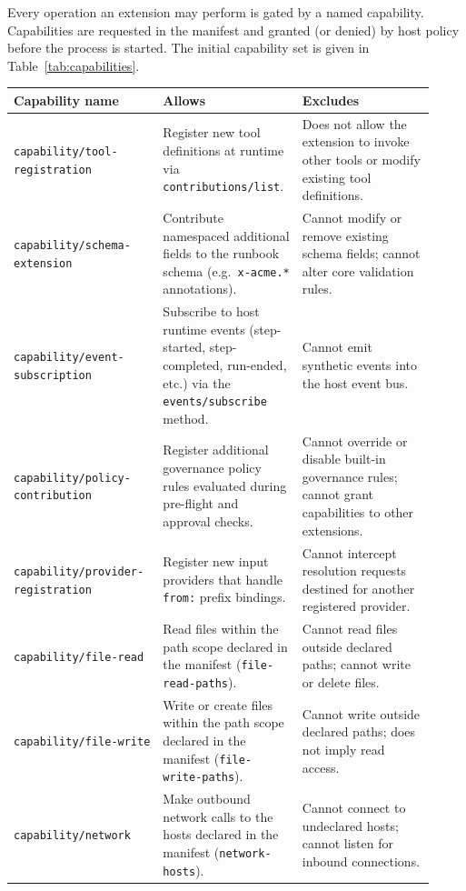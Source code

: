 Every operation an extension may perform is gated by a named capability.
Capabilities are requested in the manifest and granted (or denied) by host
policy before the process is started.  The initial capability set is given in
Table~\ref{tab:capabilities}.

\begin{table}[ht]
\centering
\begin{tabular}{p{0.32\linewidth}p{0.30\linewidth}p{0.30\linewidth}}
\hline
\textbf{Capability name} & \textbf{Allows} & \textbf{Excludes} \\
\hline
\texttt{capability/tool-registration} &
  Register new tool definitions at runtime via \texttt{contributions/list}. &
  Does not allow the extension to invoke other tools or modify existing tool
  definitions. \\
\hline
\texttt{capability/schema-extension} &
  Contribute namespaced additional fields to the runbook schema (e.g.\
  \texttt{x-acme.*} annotations). &
  Cannot modify or remove existing schema fields; cannot alter core validation
  rules. \\
\hline
\texttt{capability/event-subscription} &
  Subscribe to host runtime events (step-started, step-completed, run-ended,
  etc.) via the \texttt{events/subscribe} method. &
  Cannot emit synthetic events into the host event bus. \\
\hline
\texttt{capability/policy-contribution} &
  Register additional governance policy rules evaluated during pre-flight and
  approval checks. &
  Cannot override or disable built-in governance rules; cannot grant
  capabilities to other extensions. \\
\hline
\texttt{capability/provider-registration} &
  Register new input providers that handle \texttt{from:} prefix bindings. &
  Cannot intercept resolution requests destined for another registered
  provider. \\
\hline
\texttt{capability/file-read} &
  Read files within the path scope declared in the manifest
  (\texttt{file-read-paths}). &
  Cannot read files outside declared paths; cannot write or delete files. \\
\hline
\texttt{capability/file-write} &
  Write or create files within the path scope declared in the manifest
  (\texttt{file-write-paths}). &
  Cannot write outside declared paths; does not imply read access. \\
\hline
\texttt{capability/network} &
  Make outbound network calls to the hosts declared in the manifest
  (\texttt{network-hosts}). &
  Cannot connect to undeclared hosts; cannot listen for inbound connections. \\

\end{tabular}
\end{table}
